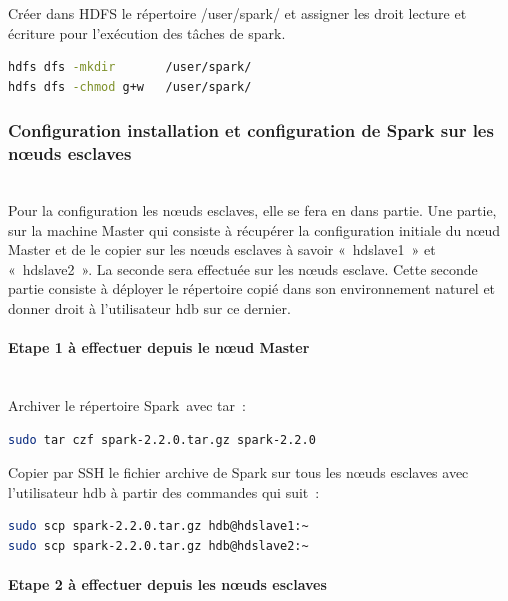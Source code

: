\documentclass[12pt,english]{book}
\begin{document}
Créer dans HDFS le répertoire /user/spark/ et assigner les droit lecture et écriture pour l’exécution des tâches de spark. 

\begin{lstlisting}[language=bash, frame=single, basicstyle=\footnotesize]
hdfs dfs -mkdir       /user/spark/
hdfs dfs -chmod g+w   /user/spark/
\end{lstlisting}

\subsubsection{Configuration installation et configuration de Spark sur les nœuds esclaves}\mbox{}\\

Pour la configuration les nœuds esclaves, elle se fera en dans partie.
Une partie, sur la machine Master qui consiste à récupérer la configuration initiale du nœud Master et de le copier sur les nœuds esclaves à savoir « hdslave1 » et « hdslave2 ».
La seconde sera effectuée sur les nœuds esclave. Cette seconde partie consiste à déployer le répertoire copié dans son environnement naturel et donner droit à l’utilisateur hdb sur ce dernier. 

\paragraph{Etape 1 à effectuer depuis le nœud Master}\mbox{}\\

Archiver le répertoire Spark avec tar :  

\begin{lstlisting}[language=bash, frame=single, basicstyle=\footnotesize]
sudo tar czf spark-2.2.0.tar.gz spark-2.2.0
\end{lstlisting}

Copier par SSH le fichier archive de Spark sur tous les nœuds esclaves avec l’utilisateur hdb à partir des commandes qui suit :

\begin{lstlisting}[language=bash, frame=single, basicstyle=\footnotesize]
sudo scp spark-2.2.0.tar.gz hdb@hdslave1:~
sudo scp spark-2.2.0.tar.gz hdb@hdslave2:~
\end{lstlisting}

\paragraph{Etape 2 à effectuer depuis les nœuds esclaves}\mbox{}\\
\end{document}
